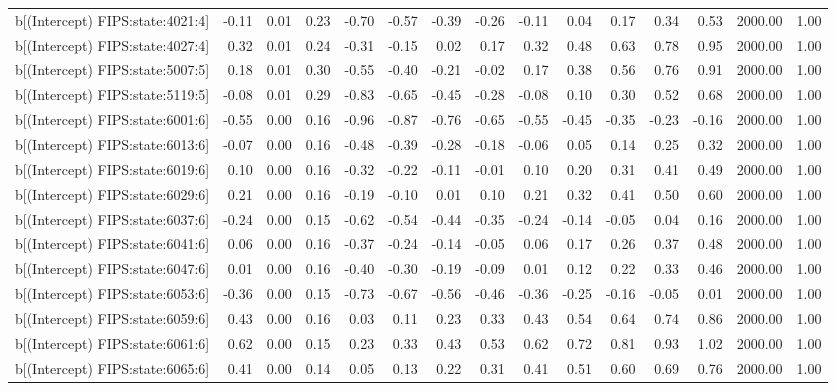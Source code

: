 \begin{table}[ht]
\begin{tabular}{rrrrrrrrrrrrrrr}
  b[(Intercept) FIPS:state:4021:4] & -0.11 & 0.01 & 0.23 & -0.70 & -0.57 & -0.39 & -0.26 & -0.11 & 0.04 & 0.17 & 0.34 & 0.53 & 2000.00 & 1.00 \\ 
  b[(Intercept) FIPS:state:4027:4] & 0.32 & 0.01 & 0.24 & -0.31 & -0.15 & 0.02 & 0.17 & 0.32 & 0.48 & 0.63 & 0.78 & 0.95 & 2000.00 & 1.00 \\ 
  b[(Intercept) FIPS:state:5007:5] & 0.18 & 0.01 & 0.30 & -0.55 & -0.40 & -0.21 & -0.02 & 0.17 & 0.38 & 0.56 & 0.76 & 0.91 & 2000.00 & 1.00 \\ 
  b[(Intercept) FIPS:state:5119:5] & -0.08 & 0.01 & 0.29 & -0.83 & -0.65 & -0.45 & -0.28 & -0.08 & 0.10 & 0.30 & 0.52 & 0.68 & 2000.00 & 1.00 \\ 
  b[(Intercept) FIPS:state:6001:6] & -0.55 & 0.00 & 0.16 & -0.96 & -0.87 & -0.76 & -0.65 & -0.55 & -0.45 & -0.35 & -0.23 & -0.16 & 2000.00 & 1.00 \\ 
  b[(Intercept) FIPS:state:6013:6] & -0.07 & 0.00 & 0.16 & -0.48 & -0.39 & -0.28 & -0.18 & -0.06 & 0.05 & 0.14 & 0.25 & 0.32 & 2000.00 & 1.00 \\ 
  b[(Intercept) FIPS:state:6019:6] & 0.10 & 0.00 & 0.16 & -0.32 & -0.22 & -0.11 & -0.01 & 0.10 & 0.20 & 0.31 & 0.41 & 0.49 & 2000.00 & 1.00 \\ 
  b[(Intercept) FIPS:state:6029:6] & 0.21 & 0.00 & 0.16 & -0.19 & -0.10 & 0.01 & 0.10 & 0.21 & 0.32 & 0.41 & 0.50 & 0.60 & 2000.00 & 1.00 \\ 
  b[(Intercept) FIPS:state:6037:6] & -0.24 & 0.00 & 0.15 & -0.62 & -0.54 & -0.44 & -0.35 & -0.24 & -0.14 & -0.05 & 0.04 & 0.16 & 2000.00 & 1.00 \\ 
  b[(Intercept) FIPS:state:6041:6] & 0.06 & 0.00 & 0.16 & -0.37 & -0.24 & -0.14 & -0.05 & 0.06 & 0.17 & 0.26 & 0.37 & 0.48 & 2000.00 & 1.00 \\ 
  b[(Intercept) FIPS:state:6047:6] & 0.01 & 0.00 & 0.16 & -0.40 & -0.30 & -0.19 & -0.09 & 0.01 & 0.12 & 0.22 & 0.33 & 0.46 & 2000.00 & 1.00 \\ 
  b[(Intercept) FIPS:state:6053:6] & -0.36 & 0.00 & 0.15 & -0.73 & -0.67 & -0.56 & -0.46 & -0.36 & -0.25 & -0.16 & -0.05 & 0.01 & 2000.00 & 1.00 \\ 
  b[(Intercept) FIPS:state:6059:6] & 0.43 & 0.00 & 0.16 & 0.03 & 0.11 & 0.23 & 0.33 & 0.43 & 0.54 & 0.64 & 0.74 & 0.86 & 2000.00 & 1.00 \\ 
  b[(Intercept) FIPS:state:6061:6] & 0.62 & 0.00 & 0.15 & 0.23 & 0.33 & 0.43 & 0.53 & 0.62 & 0.72 & 0.81 & 0.93 & 1.02 & 2000.00 & 1.00 \\ 
  b[(Intercept) FIPS:state:6065:6] & 0.41 & 0.00 & 0.14 & 0.05 & 0.13 & 0.22 & 0.31 & 0.41 & 0.51 & 0.60 & 0.69 & 0.76 & 2000.00 & 1.00 \\ 

\end{tabular}
\end{table}
